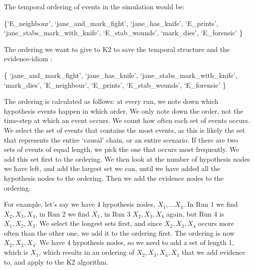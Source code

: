 \begin{example}
The temporal ordering of events in the simulation would be:

\{`E\_neighbour', `jane\_and\_mark\_fight', 
`jane\_has\_knife', `E\_prints',
 `jane\_stabs\_mark\_with\_knife', `E\_stab\_wounds',
 `mark\_dies', `E\_forensic' 
 \}
 
 The ordering we want to give to K2 to save the temporal structure and the evidence-idiom \citet{Fenton2012}:
 
 \{ `jane\_and\_mark\_fight', 
`jane\_has\_knife', 
 `jane\_stabs\_mark\_with\_knife', 
 `mark\_dies',
 'E\_neighbour',
  `E\_prints',
 `E\_stab\_wounds',
  `E\_forensic' 
 \}

\end{example}


The ordering is calculated as follows: at every run, we note down which hypothesis events happen in which order. We only note down the order, not the time-step at which an event occurs. We count how often each set of events occurs. We select the set of events that contains the most events, as this is likely the set that represents the entire `causal' chain, or an entire scenario. If there are two sets of events of equal length, we pick the one that occurs most frequently. We add this set first to the ordering. We then look at the number of hypothesis nodes we have left, and add the largest set we can, until we have added all the hypothesis nodes to the ordering. Then we add the evidence nodes to the ordering.

For example, let's say we have 4 hypothesis nodes, $X_1,...X_4$. In Run 1 we find $X_2, X_3, X_4$, in Run 2 we find $X_1$, in Run 3 $X_2, X_3, X_4$ again, but Run 4 is $X_1, X_2, X_3$. We select the longest sets first, and since $X_2, X_3, X_4$ occurs more often than the other one, we add it to the ordering first.  The ordering is now $X_2, X_3, X_4$. We have 4 hypothesis nodes, so we need to add a set of length 1, which is $X_1$, which results in an ordering of $X_2, X_3, X_4, X_1$ that we add evidence to, and apply to the K2 algorithm.


